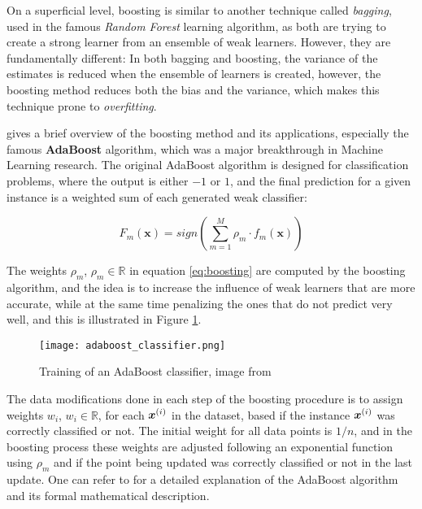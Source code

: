 On a superficial level, boosting is similar to another technique called \textit{bagging}, used in the famous \textit{Random Forest} learning algorithm, as both are trying to create a strong learner from an ensemble of weak learners. However, they are fundamentally different: In both bagging and boosting, the variance of the estimates is reduced when the ensemble of learners is created, however, the boosting method reduces both the bias and the variance, which makes this technique prone to \textit{overfitting}.

\cite{Schapire:1999:BIB:1624312.1624417} gives a brief overview of the boosting method and its applications, especially the famous \textbf{AdaBoost} algorithm, which was a major breakthrough in Machine Learning research. The original AdaBoost algorithm is designed for classification problems, where the output is either $-1$ or $1$, and the final prediction for a given instance is a weighted sum of each generated weak classifier:

\begin{equation}\label{eq:boosting}
    F_m(\bm{x}) = sign(\sum_{m=1}^{M}\rho_m\cdot f_m(\bm{x}))
\end{equation}

\noindent The weights $\rho_m$, $\rho_m \in \mathbb{R}$ in equation \ref{eq:boosting} are computed by the boosting algorithm, and the idea is to increase the influence of weak learners that are more accurate, while at the same time penalizing the ones that do not predict very well, and this is illustrated in Figure \ref{fig:humanbeta}.

\begin{figure}[!h]
    \centering
    \texttt{[image: adaboost\_classifier.png]} 
    \caption{Training of an AdaBoost classifier, image from \cite{adaboost:brendan}}
    \label{fig:humanbeta} 
  \end{figure}
  
The data modifications done in each step of the boosting procedure is to assign weights $w_i$, $w_i \in \mathbb{R}$, for each $\bm{x}^{(i)}$ in the dataset, based if the instance $\bm{x}^{(i)}$ was correctly classified or not. The initial weight for all data points is $1/n$, and in the boosting process these weights are adjusted following an exponential function using $\rho_m$ and if the point being updated was correctly classified or not in the last update. One can refer to \cite{hastie2009elements} for a detailed explanation of the AdaBoost algorithm and its formal mathematical description. 


